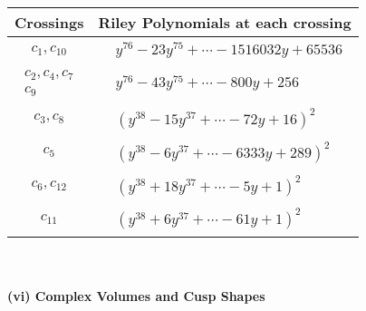 \documentclass[1p]{elsarticle_modified}
\theoremstyle{definition}
\begin{document}
\begin{tabular}{m{50pt}|m{274pt}}
Crossings & \hspace{64pt}Riley Polynomials at each crossing \\
\hline $$\begin{aligned}c_{1},c_{10}\end{aligned}$$&$\begin{aligned}
&y^{76}-23 y^{75}+\cdots-1516032 y+65536
\end{aligned}$\\
\hline $$\begin{aligned}c_{2},c_{4},c_{7}\\c_{9}\end{aligned}$$&$\begin{aligned}
&y^{76}-43 y^{75}+\cdots-800 y+256
\end{aligned}$\\
\hline $$\begin{aligned}c_{3},c_{8}\end{aligned}$$&$\begin{aligned}
&(y^{38}-15 y^{37}+\cdots-72 y+16)^{2}
\end{aligned}$\\
\hline $$\begin{aligned}c_{5}\end{aligned}$$&$\begin{aligned}
&(y^{38}-6 y^{37}+\cdots-6333 y+289)^{2}
\end{aligned}$\\
\hline $$\begin{aligned}c_{6},c_{12}\end{aligned}$$&$\begin{aligned}
&(y^{38}+18 y^{37}+\cdots-5 y+1)^{2}
\end{aligned}$\\
\hline $$\begin{aligned}c_{11}\end{aligned}$$&$\begin{aligned}
&(y^{38}+6 y^{37}+\cdots-61 y+1)^{2}
\end{aligned}$\\
\hline
\end{tabular}\\~\\
\newpage\flushleft \textbf{(vi) Complex Volumes and Cusp Shapes}
\end{document}
